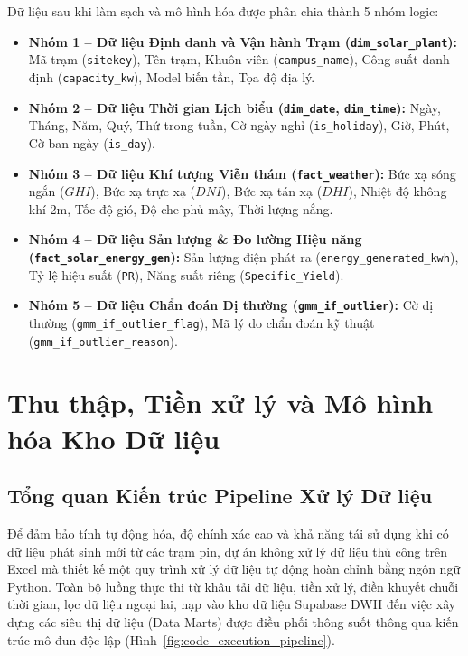 \documentclass[12pt, a4paper]{report}
\begin{document}
Dữ liệu sau khi làm sạch và mô hình hóa được phân chia thành 5 nhóm logic:
\begin{itemize}[noitemsep]
    \item \textbf{Nhóm 1 -- Dữ liệu Định danh và Vận hành Trạm (\texttt{dim\_solar\_plant}):} Mã trạm (\texttt{sitekey}), Tên trạm, Khuôn viên (\texttt{campus\_name}), Công suất danh định (\texttt{capacity\_kw}), Model biến tần, Tọa độ địa lý.
    \item \textbf{Nhóm 2 -- Dữ liệu Thời gian Lịch biểu (\texttt{dim\_date}, \texttt{dim\_time}):} Ngày, Tháng, Năm, Quý, Thứ trong tuần, Cờ ngày nghỉ (\texttt{is\_holiday}), Giờ, Phút, Cờ ban ngày (\texttt{is\_day}).
    \item \textbf{Nhóm 3 -- Dữ liệu Khí tượng Viễn thám (\texttt{fact\_weather}):} Bức xạ sóng ngắn ($GHI$), Bức xạ trực xạ ($DNI$), Bức xạ tán xạ ($DHI$), Nhiệt độ không khí 2m, Tốc độ gió, Độ che phủ mây, Thời lượng nắng.
    \item \textbf{Nhóm 4 -- Dữ liệu Sản lượng \& Đo lường Hiệu năng (\texttt{fact\_solar\_energy\_gen}):} Sản lượng điện phát ra (\texttt{energy\_generated\_kwh}), Tỷ lệ hiệu suất (\texttt{PR}), Năng suất riêng (\texttt{Specific\_Yield}).
    \item \textbf{Nhóm 5 -- Dữ liệu Chẩn đoán Dị thường (\texttt{gmm\_if\_outlier}):} Cờ dị thường (\texttt{gmm\_if\_outlier\_flag}), Mã lý do chẩn đoán kỹ thuật (\texttt{gmm\_if\_outlier\_reason}).
\end{itemize}

\chapter{Thu thập, Tiền xử lý và Mô hình hóa Kho Dữ liệu}
\label{chap:etl_modeling}

\section{Tổng quan Kiến trúc Pipeline Xử lý Dữ liệu}
\label{sec:pipeline_overview}

Để đảm bảo tính tự động hóa, độ chính xác cao và khả năng tái sử dụng khi có dữ liệu phát sinh mới từ các trạm pin, dự án không xử lý dữ liệu thủ công trên Excel mà thiết kế một quy trình xử lý dữ liệu tự động hoàn chỉnh bằng ngôn ngữ Python. Toàn bộ luồng thực thi từ khâu tải dữ liệu, tiền xử lý, điền khuyết chuỗi thời gian, lọc dữ liệu ngoại lai, nạp vào kho dữ liệu Supabase DWH đến việc xây dựng các siêu thị dữ liệu (Data Marts) được điều phối thông suốt thông qua kiến trúc mô-đun độc lập (Hình~\ref{fig:code_execution_pipeline}).
\end{document}
